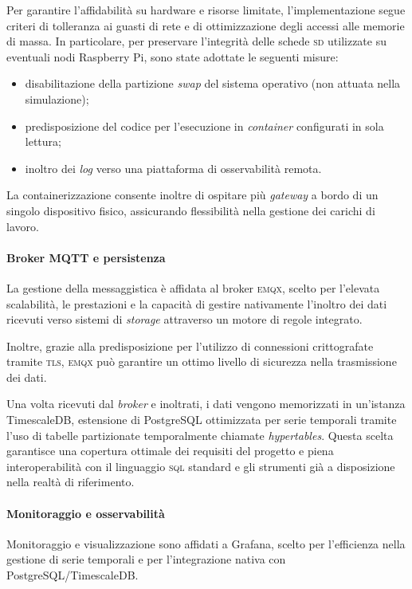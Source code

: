 \documentclass[12pt]{article}
\begin{document}
    Per garantire l'affidabilità su hardware e risorse limitate, l'implementazione segue criteri di tolleranza ai guasti di rete e di ottimizzazione degli accessi alle memorie di massa. In particolare, per preservare l'integrità delle schede \textsc{sd} utilizzate su eventuali nodi Raspberry Pi, sono state adottate le seguenti misure:
    \begin{itemize}
        \item disabilitazione della partizione \textit{swap} del sistema operativo (non attuata nella simulazione);
        \item predisposizione del codice per l'esecuzione in \textit{container} configurati in sola lettura;
        \item inoltro dei \textit{log} verso una piattaforma di osservabilità remota.
    \end{itemize}

    La containerizzazione consente inoltre di ospitare più \textit{gateway} a bordo di un singolo dispositivo fisico, assicurando flessibilità nella gestione dei carichi di lavoro.

    \paragraph{Broker MQTT e persistenza}

    La gestione della messaggistica è affidata al broker \textsc{emqx}, scelto per l'elevata scalabilità, le prestazioni e la capacità di gestire nativamente l'inoltro dei dati ricevuti verso sistemi di \textit{storage} attraverso un motore di regole integrato.
    
    Inoltre, grazie alla predisposizione per l'utilizzo di connessioni crittografate tramite \textsc{tls}, \textsc{emqx} può garantire un ottimo livello di sicurezza nella trasmissione dei dati.
    
    Una volta ricevuti dal \textit{broker} e inoltrati, i dati vengono memorizzati in un'istanza TimescaleDB, estensione di PostgreSQL ottimizzata per serie temporali tramite l'uso di tabelle partizionate temporalmente chiamate \textit{hypertables}. Questa scelta garantisce una copertura ottimale dei requisiti del progetto e piena interoperabilità con il linguaggio \textsc{sql} standard e gli strumenti già a disposizione nella realtà di riferimento. 

    \paragraph{Monitoraggio e osservabilità}
    Monitoraggio e visualizzazione sono affidati a Grafana, scelto per l'efficienza nella gestione di serie temporali e per l'integrazione nativa con PostgreSQL/TimescaleDB.
\end{document}
